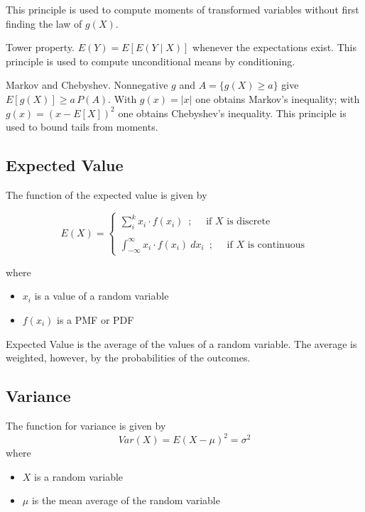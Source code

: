 \documentclass{article}
\begin{document}
This principle is used to compute moments of transformed variables without first finding the law of $g(X)$.

Tower property. $E(Y)=E[E(Y\mid X)]$ whenever the expectations exist. This principle is used to compute unconditional means by conditioning.

Markov and Chebyshev. Nonnegative $g$ and $A=\{g(X)\ge a\}$ give $E[g(X)]\ge a\,P(A)$. With $g(x)=|x|$ one obtains Markov’s inequality; with $g(x)=(x-E[X])^2$ one obtains Chebyshev’s inequality. This principle is used to bound tails from moments.

\subsection{Expected Value}
The function of the expected value is given by

$$
E(X) = \begin{cases} \sum_{i}^{k} x_i \cdot f(x_i) \enspace ; \quad \text{ if } X \text{ is discrete} \\ \\ \int_{-\infty}^{\infty} x_i \cdot f(x_i) \: dx_i \enspace ; \quad \text{ if } X \text{ is continuous} \end{cases}
$$ 

where

\begin{itemize}
    \item $x_i$ is a value of a random variable
    \item $f(x_i)$ is a PMF or PDF
\end{itemize}

Expected Value is the average of the values of a random variable. The average is weighted, however, by the probabilities of the outcomes.

\subsection{Variance}
The function for variance is given by
$$
Var(X) = E(X-\mu)^2 = \sigma^2
$$
where 

\begin{itemize}
    \item $X$ is a random variable
    \item $\mu$ is the mean average of the random variable
\end{itemize}
\end{document}
